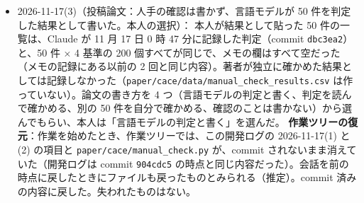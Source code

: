 \documentclass[11pt,a4paper]{jsarticle}
\begin{document}
\begin{itemize}[nosep]
    \textbf{名称と題名}：先生の手順（特徴を表す単語を並べる、組み合わせる、頭文字を取る）で候補を作り、本人が SERVE（SEt-aware Retrieval of Variable-linked Equations）と、題名「SERVE: Set-aware retrieval of variable-linked equations for automated physical model building」を選んだ。ほかの候補は CoVER、LinkER、QUEST、EQUIP。式や数式の検索で同じ名前の手法は、Web 検索 3 回では見つからなかった。原稿ではマクロ \texttt{\textbackslash ours}（\texttt{make\_numbers.py} の \texttt{METHOD\_NAME}）で書き、「the proposed method」は原稿の点検が調べる。凡例に名称が出る図 2 枚（全体の比較、特性別）は、論文用に作り直した（\texttt{paper/cace/make\_figures.py}。修論の図は変えていない）。先生の了承はまだ取っていない。
    \textbf{語数}：本文の上限を 10,000 語から 10,700 語にした（考察が増えたため。設計書の「約 9,300 語、±15\%」の範囲内）。
    \textbf{確認}：論文は \texttt{latexmk} が exit 0 で 76 ページ、本文 10,307 語、Abstract 250 語、原稿の点検は合格。全テストは 862 passed、3 skipped、1 failed（\texttt{tests/test\_fig\_overview.py}。この作業と関係のない、前からの失敗）。
  \item 2026-11-17(3)（投稿論文：人手の確認は書かず、言語モデルが 50 件を判定した結果として書いた。本人の選択）：
    本人が結果として貼った 50 件の一覧は、Claude が 11 月 17 日 0 時 47 分に記録した判定（commit \texttt{dbc3ea2}）と、50 件 × 4 基準の 200 個すべてが同じで、メモの欄はすべて空だった（メモの記録にある以前の 2 回と同じ内容）。著者が独立に確かめた結果としては記録しなかった（\texttt{paper/cace/data/manual\_check\_results.csv} は作っていない）。論文の書き方を 4 つ（言語モデルの判定と書く、判定を読んで確かめる、別の 50 件を自分で確かめる、確認のことは書かない）から選んでもらい、本人は「言語モデルの判定と書く」を選んだ。
    \textbf{作業ツリーの復元}：作業を始めたとき、作業ツリーでは、この開発ログの 2026-11-17(1) と (2) の項目と \texttt{paper/cace/manual\_check.py} が、commit されないまま消えていた（開発ログは commit \texttt{904cdc5} の時点と同じ内容だった）。会話を前の時点に戻したときにファイルも戻ったものとみられる（推定）。commit 済みの内容に戻した。失われたものはない。

\end{itemize}
\end{document}
